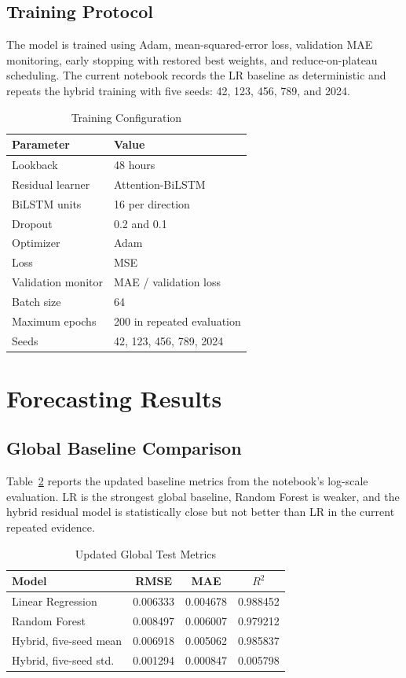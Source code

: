 \documentclass[journal]{IEEEtran}
\begin{document}
\subsection{Training Protocol}
The model is trained using Adam, mean-squared-error loss, validation MAE monitoring, early stopping with restored best weights, and reduce-on-plateau scheduling. The current notebook records the LR baseline as deterministic and repeats the hybrid training with five seeds: 42, 123, 456, 789, and 2024.

\begin{table}[!t]
\caption{Training Configuration}
\label{tab:training_config}
\centering
\begin{tabular}{ll}
\toprule
Parameter & Value \\
\midrule
Lookback & 48 hours \\
Residual learner & Attention-BiLSTM \\
BiLSTM units & 16 per direction \\
Dropout & 0.2 and 0.1 \\
Optimizer & Adam \\
Loss & MSE \\
Validation monitor & MAE / validation loss \\
Batch size & 64 \\
Maximum epochs & 200 in repeated evaluation \\
Seeds & 42, 123, 456, 789, 2024 \\
\bottomrule
\end{tabular}
\end{table}

\section{Forecasting Results}
\subsection{Global Baseline Comparison}
Table~\ref{tab:global_baselines} reports the updated baseline metrics from the notebook's log-scale evaluation. LR is the strongest global baseline, Random Forest is weaker, and the hybrid residual model is statistically close but not better than LR in the current repeated evidence.

\begin{table}[!t]
\caption{Updated Global Test Metrics}
\label{tab:global_baselines}
\centering
\begin{tabular}{lccc}
\toprule
Model & RMSE & MAE & $R^2$ \\
\midrule
Linear Regression & 0.006333 & 0.004678 & 0.988452 \\
Random Forest & 0.008497 & 0.006007 & 0.979212 \\
Hybrid, five-seed mean & 0.006918 & 0.005062 & 0.985837 \\
Hybrid, five-seed std. & 0.001294 & 0.000847 & 0.005798 \\
\bottomrule
\end{tabular}
\end{table}
\end{document}
